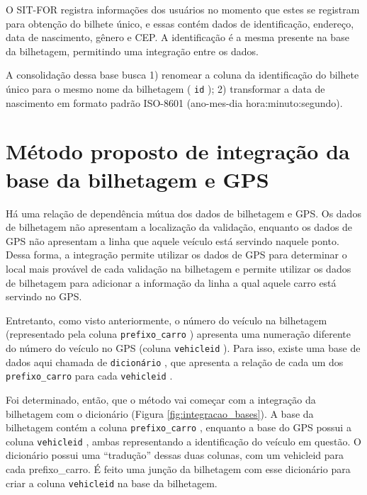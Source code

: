 \documentclass[        
    a4paper,          %
    12pt,             %
    chapter=TITLE,    %
    section=Title,    %
    subsection=Title, %
    oneside,          %
    english,          %
    spanish,          %
    brazil,           %
    fleqn             %
]{abntex2}
\let\oldtexttt\texttt
\renewcommand{\texttt}[1]{
  \colorbox{bgcolor}{\oldtexttt{#1}}
}
\begin{document}
  O SIT-FOR registra informações dos usuários no momento que estes se registram para obtenção do bilhete único, e essas contém dados de identificação, endereço, data de nascimento, gênero e CEP. A identificação é a mesma presente na base da bilhetagem, permitindo uma integração entre os dados.
  
  A consolidação dessa base busca 1) renomear a coluna da identificação do bilhete único para o mesmo nome da bilhetagem (\texttt{id}); 2) transformar a data de nascimento em formato padrão ISO-8601 (ano-mes-dia hora:minuto:segundo).
  
  \hypertarget{metodo-proposto-de-integracao-da-base-da-bilhetagem-e-gps}{%
  \section{Método proposto de integração da base da bilhetagem e GPS}\label{metodo-proposto-de-integracao-da-base-da-bilhetagem-e-gps}}
  
  Há uma relação de dependência mútua dos dados de bilhetagem e GPS. Os dados de bilhetagem não apresentam a localização da validação, enquanto os dados de GPS não apresentam a linha que aquele veículo está servindo naquele ponto. Dessa forma, a integração permite utilizar os dados de GPS para determinar o local mais provável de cada validação na bilhetagem e permite utilizar os dados de bilhetagem para adicionar a informação da linha a qual aquele carro está servindo no GPS.
  
  Entretanto, como visto anteriormente, o número do veículo na bilhetagem (representado pela coluna \texttt{prefixo\_carro}) apresenta uma numeração diferente do número do veículo no GPS (coluna \texttt{vehicleid}). Para isso, existe uma base de dados aqui chamada de \texttt{dicionário}, que apresenta a relação de cada um dos \texttt{prefixo\_carro} para cada \texttt{vehicleid}.
  
  Foi determinado, então, que o método vai começar com a integração da bilhetagem com o dicionário (Figura \ref{fig:integracao_bases}). A base da bilhetagem contém a coluna \texttt{prefixo\_carro}, enquanto a base do GPS possui a coluna \texttt{vehicleid}, ambas representando a identificação do veículo em questão. O dicionário possui uma ``tradução'' dessas duas colunas, com um vehicleid para cada prefixo\_carro. É feito uma junção da bilhetagem com esse dicionário para criar a coluna \texttt{vehicleid} na base da bilhetagem.
  
  \begin{figure}[!h]
  \captionsetup{width=16cm}
  \centering
  \end{figure}
  
\end{document}
